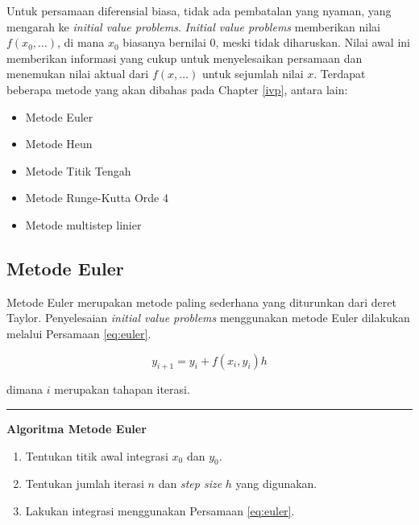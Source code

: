 \documentclass[]{book}
\providecommand{\tightlist}{%
  \setlength{\itemsep}{0pt}\setlength{\parskip}{0pt}}
\theoremstyle{definition}
\theoremstyle{definition}
\theoremstyle{definition}
\theoremstyle{remark}
\begin{document}
Untuk persamaan diferensial biasa, tidak ada pembatalan yang nyaman, yang mengarah ke \emph{initial value problems}. \emph{Initial value problems} memberikan nilai \(f\left(x_0,\dots\right)\), di mana \(x_0\) biasanya bernilai 0, meski tidak diharuskan. Nilai awal ini memberikan informasi yang cukup untuk menyelesaikan persamaan dan menemukan nilai aktual dari \(f\left(x,\dots\right)\) untuk sejumlah nilai \(x\). Terdapat beberapa metode yang akan dibahas pada Chapter \ref{ivp}, antara lain:

\begin{itemize}
\tightlist
\item
  Metode Euler
\item
  Metode Heun
\item
  Metode Titik Tengah
\item
  Metode Runge-Kutta Orde 4
\item
  Metode multistep linier
\end{itemize}

\hypertarget{eulermethod}{%
\subsection{Metode Euler}\label{eulermethod}}

Metode Euler merupakan metode paling sederhana yang diturunkan dari deret Taylor. Penyelesaian \emph{initial value problems} menggunakan metode Euler dilakukan melalui Persamaan \eqref{eq:euler}.

\begin{equation}
y_{i+1}=y_i+f\left(x_i,y_i\right)h
  \label{eq:euler}
\end{equation}

dimana \(i\) merupakan tahapan iterasi.

\begin{center}\rule{0.5\linewidth}{\linethickness}\end{center}

\textbf{Algoritma Metode Euler}

\begin{enumerate}
\def\labelenumi{\arabic{enumi}.}
\tightlist
\item
  Tentukan titik awal integrasi \(x_0\) dan \(y_0\).
\item
  Tentukan jumlah iterasi \(n\) dan \emph{step size} \(h\) yang digunakan.
\item
  Lakukan integrasi menggunakan Persamaan \eqref{eq:euler}.
\end{enumerate}
\end{document}
